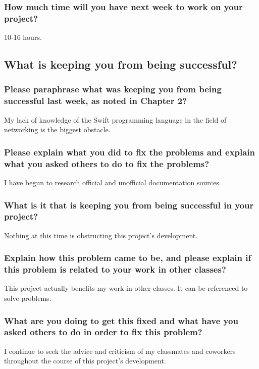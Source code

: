 \documentclass[letterpaper]{article}            %
\begin{document}
\subsubsection{How much time will you have next week to work on your project?}

10-16 hours.


\subsection{What is keeping you from being successful?}

\subsubsection{Please paraphrase what was keeping you from being successful last week, as noted in Chapter 2?}

My lack of knowledge of the Swift programming language in the field of networking is the biggest obstacle.

\subsubsection{Please explain what you did to fix the problems and explain what you asked others to do to fix the problems?}

I have begun to research official and unofficial documentation sources.

\subsubsection{What is it that is keeping you from being successful in your project?}

Nothing at this time is obstructing this project's development.

\subsubsection{Explain how this problem came to be, and please explain if this problem is related to your work in other classes?}

This project actually benefits my work in other classes. It can be referenced to solve problems.

\subsubsection{What are you doing to get this fixed and what have you asked others to do
in order to fix this problem?}

I continue to seek the advice and criticism of my classmates and coworkers throughout the course of this project's development.
\end{document}
